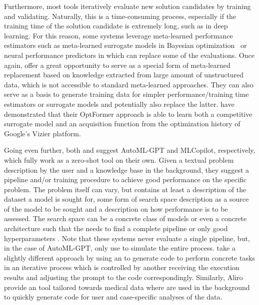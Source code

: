 Furthermore, most \AutoML tools iteratively evaluate new solution candidates by training and validating. Naturally, this is a time-consuming process, especially if the training time of the solution candidate is extremely long, such as in deep learning. For this reason, some systems leverage meta-learned performance estimators such as meta-learned surrogate models in Bayesian optimization~\cite{vanschoren-automlbook19a} or neural performance predictors in \NAS \cite{white-neurips21a} which can replace some of the evaluations. Once again, \LLMs offer a great opportunity to serve as a special form of meta-learned replacement based on knowledge extracted from large amount of unstructured data, which is not accessible to standard meta-learned approaches. They can also serve as a basis to generate training data for simpler performance/training time estimators or surrogate models and potentially also replace the latter. \citet{chen-neurips22a} have demonstrated that their OptFormer approach is able to learn both a competitive surrogate model and an acquisition function from the optimization history of Google's Vizier \cite{song-icml22b} platform.

Going even further, both \citet{zhang-arxiv23b} and \citet{zhang-arxiv23a} suggest AutoML-GPT and MLCopilot, respectively, which fully work as a zero-shot \AutoML tool on their own. Given a textual problem description by the user and a knowledge base in the background, they suggest a pipeline and/or training procedure to achieve good performance on the specific problem. The problem itself can vary, but contains at least a description of the dataset a model is sought for, some form of search space description as a source of the model to be sought and a description on how performance is to be assessed. The search space can be a concrete class of models or even a concrete architecture such that the \LLM needs to find a complete pipeline or only good hyperparameters \cite{zhang-arxiv23b}. Note that these systems never evaluate a single \ML pipeline, but, in the case of AutoML-GPT, only use \LLMs to simulate the entire \AutoML process. \citet{tsai-arxiv23a} take a slightly different approach by using an \LLM to generate code to perform concrete \AutoML tasks in an iterative process which is controlled by another \LLM receiving the execution results and adjusting the prompt to the code \LLM correspondingly. Similarly, Aliro \cite{choi-bioinformatics23a} provide an \AutoML tool tailored towards medical data where \LLMs are used in the background to quickly generate code for user and case-specific analyses of the data.

